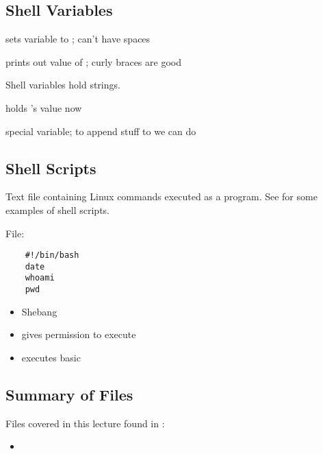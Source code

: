 \subsection{Shell Variables}
 \textrightarrow{} sets variable  to ; can't have spaces

 \textrightarrow{} prints out value of ; curly braces are good

Shell variables hold strings.

 \textrightarrow{}  holds 's value now

 \textrightarrow{} special variable; to append stuff to
 we can do 

\subsection{Shell Scripts}
Text file containing Linux commands executed as a program. See
 for some examples of shell scripts.

File: 
\begin{lstlisting}
    #!/bin/bash
    date
    whoami
    pwd
\end{lstlisting}
\begin{itemize}
    \item \code{\#!} \textrightarrow{} Shebang
    \item {} \textrightarrow{} gives permission to execute 
    \item {} \textrightarrow{} executes basic
\end{itemize}

\subsection{Summary of Files}
Files covered in this lecture found in :
\begin{itemize}
    \item {}
\end{itemize}
